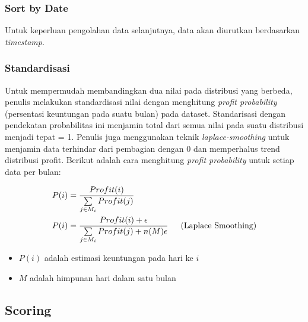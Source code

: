 \documentclass{article}
\begin{document}
\subsubsection{Sort by Date}

\begin{adjustwidth}{4em}{0pt}
	
	\hspace{\parindent}Untuk keperluan pengolahan data selanjutnya, data akan diurutkan berdasarkan \textit{timestamp}.
	
\end{adjustwidth}

\subsubsection{Standardisasi}

\begin{adjustwidth}{4em}{0pt}
	
	\hspace{\parindent}Untuk mempermudah membandingkan dua nilai pada distribusi yang berbeda, penulis melakukan standardisasi nilai dengan menghitung \textit{profit probability} (persentasi keuntungan pada suatu bulan) pada dataset. Standarisasi dengan pendekatan probabilitas ini menjamin total dari semua nilai pada suatu distribusi menjadi tepat = 1. Penulis juga menggunakan teknik \textit{laplace-smoothing} untuk menjamin data terhindar dari pembagian dengan 0 dan memperhalus trend distribusi profit. Berikut adalah cara menghitung \textit{profit probability} untuk setiap data per bulan:
	
	\begin{align*}
	P(i) &= \frac{Profit(i)} {\sum\limits_{j \in M_i} Profit(j)}\\
	P(i) &= \frac{Profit(i)+\epsilon}{\sum\limits_{j \in M_i} Profit(j)+n(M)\epsilon} \text{\indent(Laplace Smoothing)}
	\end{align*}
	
	\begin{itemize}
		\setlength{\itemindent}{1cm}
		\item{$P(i)$ adalah estimasi keuntungan pada hari ke $i$}
		\item{$M$ adalah himpunan hari dalam satu bulan}
	\end{itemize}
	
\end{adjustwidth}

\subsection{Scoring}
\end{document}

